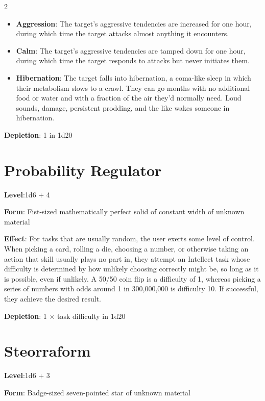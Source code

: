 \begin{multicols}{2}
\begin{itemize}
\item \textbf{Aggression}: The target’s aggressive tendencies are increased for one hour, during which time the target attacks almost anything it encounters. 
\item \textbf{Calm}: The target’s aggressive tendencies are tamped down for one hour, during which time the target responds to attacks but never initiates them. 
\item \textbf{Hibernation}: The target falls into hibernation, a coma-like sleep in which their metabolism slows to a crawl. They can go months with no additional food or water and with a fraction of the air they’d normally need. Loud sounds, damage, persistent prodding, and the like wakes someone in hibernation. 
\end{itemize}

\textbf{Depletion}: 1 in 1d20

\section{Probability Regulator}

\textbf{Level}:1d6 + 4 

\textbf{Form}: Fist-sized mathematically perfect solid of constant width of unknown material 

\textbf{Effect}: For tasks that are usually random, the user exerts some level of control. When picking a card, rolling a die, choosing a number, or otherwise taking an action that skill usually plays no part in, they attempt an Intellect task whose difficulty is determined by how unlikely choosing correctly might be, so long as it is possible, even if unlikely. A 50/50 coin flip is a difficulty of 1, whereas picking a series of numbers with odds around 1 in 300,000,000 is difficulty 10. If successful, they achieve the desired result. 

\textbf{Depletion}: 1 × task difficulty in 1d20

\section{Steorraform}

\textbf{Level}:1d6 + 3 

\textbf{Form}: Badge-sized seven-pointed star of unknown material 


\end{multicols}
